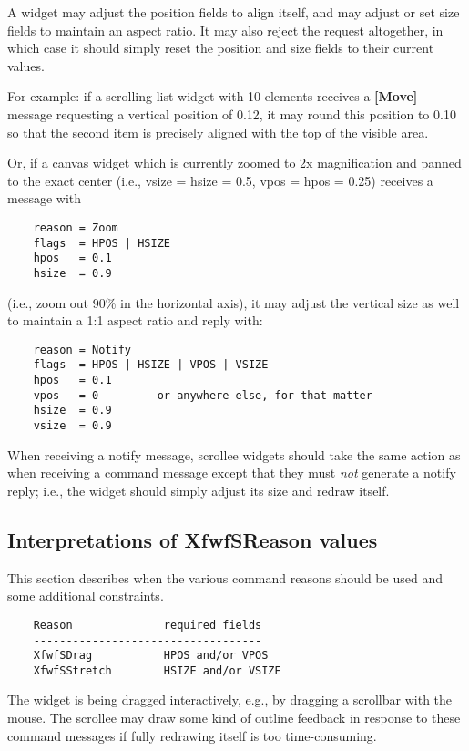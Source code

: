 A widget may adjust the position fields to align itself, and may
adjust or set size fields to maintain an aspect ratio.  It may also
reject the request altogether, in which case it should simply reset
the position and size fields to their current values.

For example: if a scrolling list widget with 10 elements receives a
{\bf [Move]} message requesting a vertical position of 0.12, it may round this
position to 0.10 so that the second item is precisely aligned with the
top of the visible area.

Or, if a canvas widget which is currently zoomed to 2x magnification and
panned to the exact center (i.e., vsize = hsize = 0.5, vpos = hpos = 0.25)
receives a message with

\begin{verbatim}
	reason = Zoom
	flags  = HPOS | HSIZE
	hpos   = 0.1
	hsize  = 0.9
\end{verbatim}

(i.e., zoom out 90\% in the horizontal axis), it may adjust the
vertical size as well to maintain a 1:1 aspect ratio and reply with:

\begin{verbatim}
	reason = Notify
	flags  = HPOS | HSIZE | VPOS | VSIZE
	hpos   = 0.1
	vpos   = 0		-- or anywhere else, for that matter
	hsize  = 0.9
	vsize  = 0.9
\end{verbatim}

When receiving a notify message, scrollee widgets should take the same
action as when receiving a command message except that they must {\it not}\/
generate a notify reply; i.e., the widget should simply adjust its
size and redraw itself.


\subsection{Interpretations of XfwfSReason values}

This section describes when the various command reasons should be used
and some additional constraints.

\begin{verbatim}
    Reason              required fields
    -----------------------------------
    XfwfSDrag           HPOS and/or VPOS
    XfwfSStretch        HSIZE and/or VSIZE
\end{verbatim}

        The widget is being dragged interactively, e.g., by dragging a
	scrollbar with the mouse.  The scrollee may draw some kind of
	outline feedback in response to these command messages if
	fully redrawing itself is too time-consuming.

